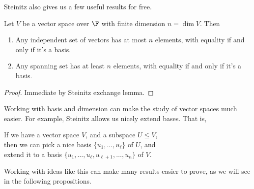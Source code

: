 \documentclass[a4paper]{scrartcl}
\begin{document}
Steinitz also gives us a few useful results for free.

\begin{corollary}
    Let $V$ be a vector space over $\F$ with finite dimension $n = \dim V$. Then
    \begin{enumerate}[label=(\roman*)]
        \item Any independent set of vectors has at most $n$ elements, with equality if and only if it's a basis.
        \item Any spanning set has at least $n$ elements, with equality if and only if it's a basis.
    \end{enumerate} 
\end{corollary}
\begin{proof}
    Immediate by Steinitz exchange lemma.
\end{proof}

Working with basis and dimension can make the study of vector spaces much easier. For example, Steinitz allows us nicely extend bases. That is,
\begin{center}
	\color{blue}
    If we have a vector space $V$, and a subspace $U \leq V$, \\then we can pick a nice basis $\{u_1, \dots, u_\ell\}$ of $U$, and \\extend it to a basis $\{u_1, \dots, u_{\ell}, u_{\ell + 1}, \dots, u_n\}$ of $V$.
\end{center}Working with ideas like this can make many results easier to prove, as we will see in the following propositions.
\end{document}
